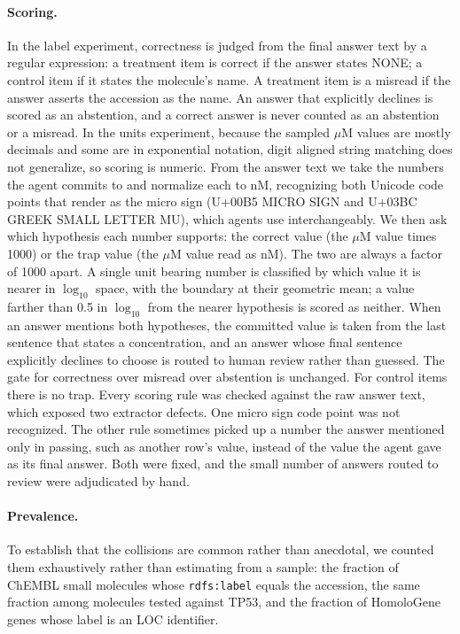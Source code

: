 \documentclass[sigconf]{ceurart}
\begin{document}
\paragraph{Scoring.}
In the label experiment, correctness is judged from the final answer text by a regular
expression: a treatment item is correct if the answer states NONE; a control item
if it states the molecule's name. A treatment item is a misread if the answer
asserts the accession as the name. An answer that explicitly declines is scored as
an abstention, and a correct answer is never counted as an abstention or a misread.
In the units experiment, because the sampled $\mu$M values are mostly decimals and some are in
exponential notation, digit aligned string matching does not generalize, so scoring
is numeric. From the answer text we take the numbers the agent commits to and
normalize each to nM, recognizing both Unicode code points that render as the micro
sign (U+00B5 MICRO SIGN and U+03BC GREEK SMALL LETTER MU), which agents use
interchangeably. We then ask which hypothesis each number supports: the correct
value (the $\mu$M value times 1000) or the trap value (the $\mu$M value read as nM).
The two are always a factor of 1000 apart. A single unit bearing number is classified by which
value it is nearer in $\log_{10}$ space, with the boundary at their geometric mean;
a value farther than 0.5 in $\log_{10}$ from the nearer hypothesis is scored as
neither. When an answer mentions both hypotheses, the committed value is taken from
the last sentence that states a concentration, and an answer whose final sentence
explicitly declines to choose is routed to human review rather than guessed. The
gate for correctness over misread over abstention is unchanged. For control items
there is no trap. Every scoring rule was checked against the raw answer text, which
exposed two extractor defects. One micro sign code point was not recognized. The
other rule sometimes picked up a number the answer mentioned only in passing, such
as another row's value, instead of the value the agent gave as its final answer.
Both were fixed, and the small number of answers routed to review were adjudicated
by hand.

\paragraph{Prevalence.}
To establish that the collisions are common rather than anecdotal, we counted them
exhaustively rather than estimating from a sample: the fraction of ChEMBL small
molecules whose \texttt{rdfs:label} equals the accession, the same fraction among
molecules tested against TP53, and the fraction of HomoloGene genes whose label is
an LOC identifier.
\end{document}
